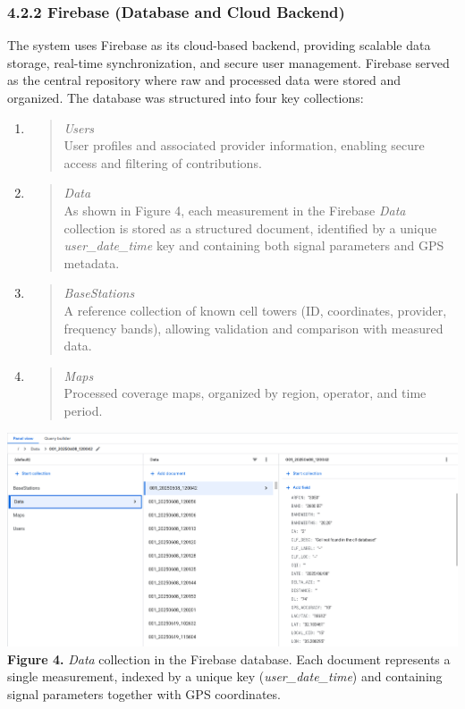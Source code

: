 \documentclass[11pt]{article}
\begin{document}
\hypertarget{firebase-database-and-cloud-backend}{%
\subsubsection{4.2.2 Firebase (Database and Cloud
Backend)}\label{firebase-database-and-cloud-backend}}

The system uses Firebase\cite{firebase2025} as its cloud-based backend, providing scalable
data storage, real-time synchronization, and secure user management.
Firebase served as the central repository where raw and processed data
were stored and organized. The database was structured into four key
collections:

\begin{enumerate}
\def\labelenumi{\arabic{enumi}.}
\item
  \begin{quote}
  \emph{Users}\\
  User profiles and associated provider information, enabling secure
  access and filtering of contributions.
  \end{quote}
\item
  \begin{quote}
  \emph{Data}\\
  As shown in Figure 4, each measurement in the Firebase \emph{Data}
  collection is stored as a structured document, identified by a unique
  \emph{user\_date\_time} key and containing both signal parameters and
  GPS metadata.
  \end{quote}
\item
  \begin{quote}
  \emph{BaseStations}\\
  A reference collection of known cell towers (ID, coordinates,
  provider, frequency bands), allowing validation and comparison with
  measured data.
  \end{quote}
\item
  \begin{quote}
  \emph{Maps}\\
  Processed coverage maps, organized by region, operator, and time
  period.
  \end{quote}
\end{enumerate}

\includegraphics[width=1.0\textwidth]{figures/media/image7.png}\\
\textbf{Figure 4.} \emph{Data} collection in the Firebase database. Each
document represents a single measurement, indexed by a unique key
(\emph{user\_date\_time}) and containing signal parameters together with
GPS coordinates.
\end{document}
